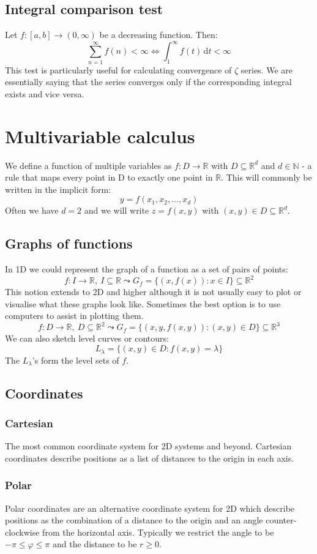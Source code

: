 \documentclass[12pt]{article}
\begin{document}
\subsection*{Integral comparison test}
Let \(f:[a,b]\to(0,\infty)\) be a decreasing function. Then:
\[\sum^\infty_{n=1}f(n)<\infty\iff\int^\infty_1f(t)\,\text{d}t<\infty\]
This test is particularly useful for calculating convergence of \(\zeta\) series. We are essentially saying that the series converges only if the corresponding integral exists and vice versa.
\section{Multivariable calculus}
We define a function of multiple variables as \(f:D\to\mathbb{R}\) with \(D\subseteq \mathbb{R}^d\) and \(d\in\mathbb{N}\) - a rule that maps every point in D to exactly one point in \(\mathbb{R}\). This will commonly be written in the implicit form:
\[y=f(x_1,x_2,...,x_d)\]
Often we have \(d=2\) and we will write \(z=f(x,y)\) with \((x,y)\in D\subseteq\mathbb{R}^d\).
\subsection*{Graphs of functions}
In 1D we could represent the graph of a function as a set of pairs of points:
\[f:I\to\mathbb{R},\ I\subseteq\mathbb{R}\leadsto G_f=\{(x,f(x)): x\in I\}\subseteq \mathbb{R}^2\]
This notion extends to 2D and higher although it is not usually easy to plot or visualise what these graphs look like. Sometimes the best option is to use computers to assist in plotting them.
\[f:D\to\mathbb{R},\ D\subseteq\mathbb{R}^2\leadsto G_f=\{(x,y,f(x,y)): (x,y)\in D\}\subseteq \mathbb{R}^3\]
We can also sketch level curves or contours:
\[L_\lambda = \{(x,y)\in D: f(x,y)=\lambda\}\]
The \(L_\lambda\)'s form the level sets of \(f\).
\subsection*{Coordinates}
\subsubsection*{Cartesian}
The most common coordinate system for 2D systems and beyond. Cartesian coordinates describe positions as a list of distances to the origin in each axis.
\subsubsection*{Polar}
Polar coordinates are an alternative coordinate system for 2D which describe positions as the combination of a distance to the origin and an angle counter-clockwise from the horizontal axis. Typically we restrict the angle to be \(-\pi\leq \varphi\leq \pi\) and the distance to be \(r\geq 0\).
\end{document}
